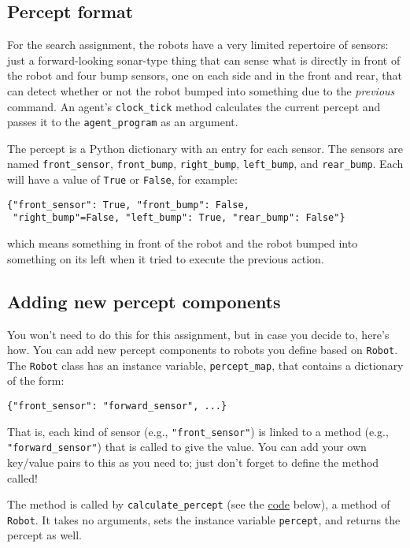 \documentclass[11pt]{tufte-handout}
\begin{document}
\subsection{Percept format}
\label{sec:org6990e36}

For the search assignment, the robots have a very  limited repertoire of sensors: just a forward-looking sonar-type thing that can  sense what is directly in front of the robot and four bump sensors, one on each side and in the front and rear, that can detect whether or not the robot bumped into something due to the \emph{previous} command.  An agent's \texttt{clock\_tick} method calculates the current percept and passes it to the \texttt{agent\_program} as an argument.

The percept is a Python dictionary with an entry for each sensor.  The sensors are named \texttt{front\_sensor}, \texttt{front\_bump}, \texttt{right\_bump}, \texttt{left\_bump}, and \texttt{rear\_bump}.  Each will have a value of \texttt{True} or \texttt{False}, for example:
\begin{verbatim}
{"front_sensor": True, "front_bump": False,
 "right_bump"=False, "left_bump": True, "rear_bump": False"}
\end{verbatim}

\noindent which means something in front of the robot and the robot bumped into something on its left when it tried to execute the previous action.

\subsection{Adding new percept components}
\label{sec:orgd5234c7}
\label{org97d62df}

You won't need to do this for this assignment, but in case you decide to, here's how.
You can add new percept components to robots you define based on \texttt{Robot}.  The \texttt{Robot} class has an instance variable, \texttt{percept\_map}, that contains a dictionary of the form:
\begin{verbatim}
{"front_sensor": "forward_sensor", ...}
\end{verbatim}

\noindent That is, each kind of sensor (e.g., \texttt{"front\_sensor"}) is linked to a method (e.g., \texttt{"forward\_sensor"}) that is called to give the value.  You can add your own key/value pairs to this as you need to; just don't forget to define the method called!

The method is called by \texttt{calculate\_percept} (see the \hyperref[org14773b1]{code} below), a method of \texttt{Robot}.  It takes no arguments, sets the instance variable \texttt{percept}, and returns the percept as well.  
\end{document}
